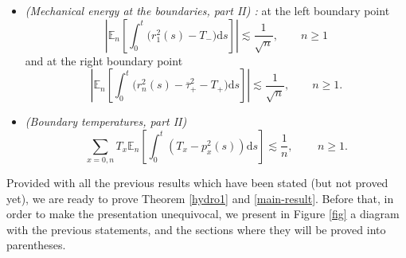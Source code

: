 \documentclass[EJP]{ejpecp} %
\renewcommand{\ge}{\geqslant}
\newcommand{\dd  }{\mathrm{d}}
\renewcommand{\bar}{\overline}
\numberwithin{equation}{section}
\begin{document}
\begin{lemma}
\begin{itemize}
\begin{equation}
      \dd s\right]  = 0, \qquad \lim_{n\to\infty}    \mathbb{E}\left[   \int_0^t  j_{n-1,n}(s)
      \dd s\right]  = 0.
  \end{equation}
\item[(vii)] \emph{(Mechanical energy at the boundaries, part II) :}  at the left boundary point
  \begin{equation}
  \left|\mathbb{E}_n\left[ \int_0^t \Big(r_1^2(s)-T_-\Big) \dd s\right]\right|\lesssim
    \frac{1}{\sqrt{n}}, \qquad n\ge 1  \label{ex-2-l11t}
\end{equation}
and at the right boundary point
\begin{equation}   
 \left|\mathbb{E}_n\left[ \int_0^t \Big(r_n^2(s)-\bar\tau_+^2-T_+\Big)\dd s\right] \right|\lesssim
    \frac{1}{\sqrt{n}}, \qquad n\ge 1. \label{ex-2-r11t}
\end{equation}
\item[(viii)] \emph{(Boundary temperatures, part II)}
\begin{equation}
    \label{eq:ex-1bis}
  \sum_{x=0,n}T_x\mathbb{E}_n\left[   \int_0^t  \left(T_x-p_{x}^2(s) \right)\dd
  s\right] \lesssim \frac{1}{n},\qquad
\,n\ge1.
 \end{equation}
 \end{itemize}
\end{lemma}








Provided with all the previous results which have been stated (but not proved yet), we are ready to prove Theorem \ref{hydro1} and \ref{main-result}. Before that, in order to make the presentation unequivocal, {we present} in Figure \ref{fig} a diagram with the previous statements, and the sections where they will be proved into parentheses.  
\end{document}

